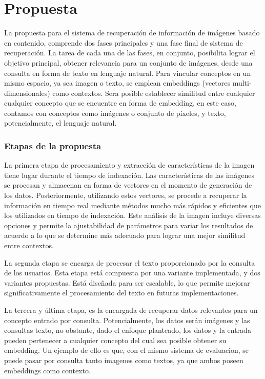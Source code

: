 \chapter{Propuesta}\label{chapter:proposal}
La propuesta para el sistema de recuperación de información de imágenes basado en contenido, comprende dos fases principales y una fase final de sistema de recuperaci\'on. La tarea de cada una de las fases, en conjunto, posibilita lograr el objetivo principal, obtener relevancia para un conjunto de im\'agenes, desde una consulta en forma de texto en lenguaje natural. Para vincular conceptos en un mismo espacio, ya sea imagen o texto, se emplean embeddings (vectores multi-dimensionales) como contextos. Sera posible establecer similitud entre cualquier cualquier concepto que se encuentre en forma de embedding, en este caso, contamos con conceptos como im\'agenes o conjunto de p\'ixeles, y texto, potencialmente, el lenguaje natural.

\subsection*{Etapas de la propuesta}

La primera etapa de procesamiento y extracción de características de la imagen tiene lugar durante el tiempo de indexación. Las características de las imágenes se procesan y almacenan en forma de vectores en el momento de generación de los datos. Posteriormente, utilizando estos vectores, se procede a recuperar la información en tiempo real mediante métodos mucho más rápidos y eficientes que los utilizados en tiempo de indexación. Este análisis de la imagen incluye diversas opciones y permite la ajustabilidad de parámetros para variar los resultados de acuerdo a lo que se determine más adecuado para lograr una mejor similitud entre contextos.

La segunda etapa se encarga de procesar el texto proporcionado por la consulta de los usuarios. Esta etapa está compuesta por una variante implementada, y dos variantes propuestas. Está diseñada para ser escalable, lo que permite mejorar significativamente el procesamiento del texto en futuras implementaciones. 

La tercera y \'ultima etapa, es la encargada de recuperar datos relevantes para un concepto entrado por consulta. Potencialmente, los datos ser\'an im\'agenes y las consultas texto, no obstante, dado el enfoque planteado, los datos y la entrada pueden pertenecer a cualquier concepto del cual sea posible obtener su embedding. Un ejemplo de ello es que, con el mismo sistema de evaluacion, se puede pasar por consulta tanto imagenes como textos, ya que ambos poseen embeddings como contexto.  

